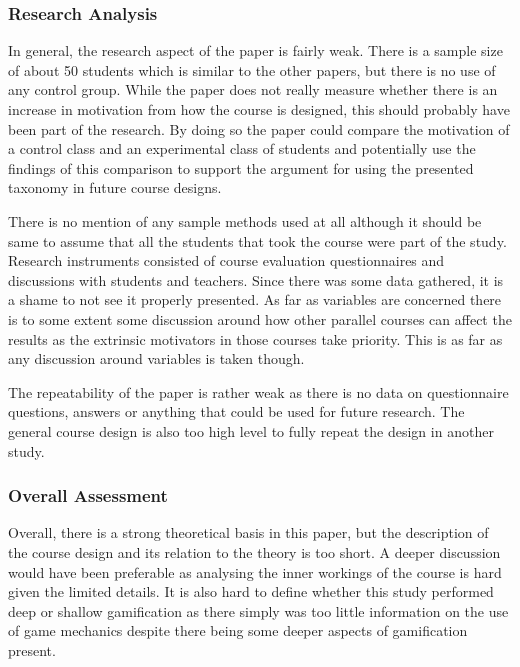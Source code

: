 \subsubsection{Research Analysis}
In general, the research aspect of the paper is fairly weak. There is a sample size of about 50 students which is similar to the other papers, but there is no use of any control group. While the paper does not really measure whether there is an increase in motivation from how the course is designed, this should probably have been part of the research. By doing so the paper could compare the motivation of a control class and an experimental class of students and potentially use the findings of this comparison to support the argument for using the presented taxonomy in future course designs. 

There is no mention of any sample methods used at all although it should be same to assume that all the students that took the course were part of the study. Research instruments consisted of course evaluation questionnaires and discussions with students and teachers. Since there was some data gathered, it is a shame to not see it properly presented. 
As far as variables are concerned there is to some extent some discussion around how other parallel courses can affect the results as the extrinsic motivators in those courses take priority. This is as far as any discussion around variables is taken though. 

The repeatability of the paper is rather weak as there is no data on questionnaire questions, answers or anything that could be used for future research. The general course design is also too high level to fully repeat the design in another study.  

\subsubsection{Overall Assessment}
Overall, there is a strong theoretical basis in this paper, but the description of the course design and its relation to the theory is too short. A deeper discussion would have been preferable as analysing the inner workings of the course is hard given the limited details. It is also hard to define whether this study performed deep or shallow gamification as there simply was too little information on the use of game mechanics despite there being some deeper aspects of gamification present.